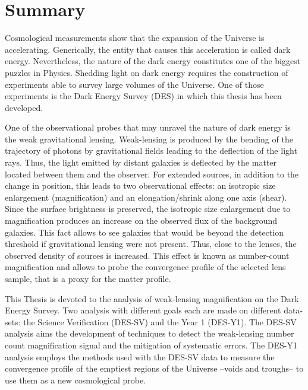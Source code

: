 \chapter*{Summary}
Cosmological measurements show that the expansion of the Universe is accelerating. Generically, the entity that causes this acceleration is called dark energy. Nevertheless, the nature of the dark energy constitutes one of the biggest puzzles in Physics. Shedding light on dark energy requires the construction of experiments able to survey large volumes of the Universe. One of those experiments is the Dark Energy Survey (DES) in which this thesis has been developed.
\newline

One of the observational probes that may unravel the nature of dark energy is the weak gravitational lensing. Weak-lensing is produced by the bending of the trajectory of photons by gravitational fields leading to the deflection of the light rays. Thus, the light emitted by distant galaxies is deflected by the matter located between them and the observer. For extended sources, in addition to the change in position, this leads to two observational effects: an isotropic size enlargement (magnification) and an elongation/shrink along one axis (shear). Since the surface brightness is preserved, the isotropic size enlargement due to magnification produces an increase on the observed flux of the background galaxies. This fact allows to see galaxies that would be beyond the detection threshold if gravitational lensing were not present. Thus, close to the lenses, the observed density of sources is increased. This effect is known as number-count magnification and allows to probe the convergence profile of the selected lens sample, that is a proxy for the matter profile.
\newline

This Thesis is devoted to the analysis of weak-lensing magnification on the Dark Energy Survey. Two analysis with different goals each are made on different data-sets: the Science Verification (DES-SV) and the Year 1 (DES-Y1). The DES-SV analysis aims the development of techniques to detect the weak-lensing number count magnification signal and the mitigation of systematic errors. The DES-Y1 analysis employs the methods used with the DES-SV data to measure the convergence profile of the emptiest regions of the Universe --voids and troughs-- to use them as a new cosmological probe.